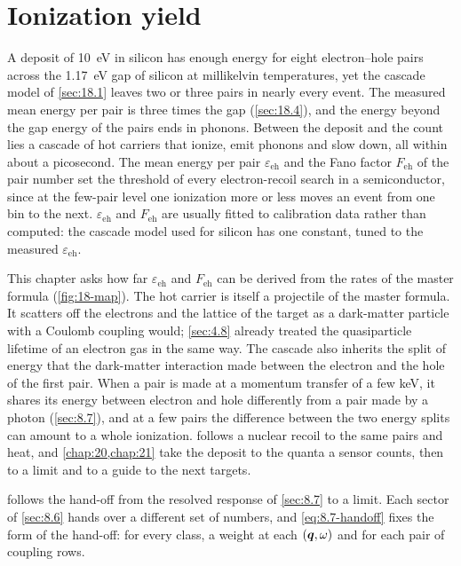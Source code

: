 \chapter{Ionization yield}\label{chap:18}
A deposit of \SI{10}{eV} in silicon has enough energy for eight electron--hole pairs across the \SI{1.17}{eV} gap of silicon at millikelvin temperatures, yet the cascade model of \cref{sec:18.1} leaves two or three pairs in nearly every event. The measured mean energy per pair is three times the gap (\cref{sec:18.4}), and the energy beyond the gap energy of the pairs ends in phonons. Between the deposit and the count lies a cascade of hot carriers that ionize, emit phonons and slow down, all within about a picosecond. The mean energy per pair $\varepsilon_{\mathrm{eh}}$ and the Fano factor $F_{\mathrm{eh}}$ of the pair number set the threshold of every electron-recoil search in a semiconductor, since at the few-pair level one ionization more or less moves an event from one bin to the next. $\varepsilon_{\mathrm{eh}}$ and $F_{\mathrm{eh}}$ are usually fitted to calibration data rather than computed: the cascade model used for silicon has one constant, tuned to the measured $\varepsilon_{\mathrm{eh}}$.

This chapter asks how far $\varepsilon_{\mathrm{eh}}$ and $F_{\mathrm{eh}}$ can be derived from the rates of the master formula (\cref{fig:18-map}). The hot carrier is itself a projectile of the master formula. It scatters off the electrons and the lattice of the target as a dark-matter particle with a Coulomb coupling would; \cref{sec:4.8} already treated the quasiparticle lifetime of an electron gas in the same way. The cascade also inherits the split of energy that the dark-matter interaction made between the electron and the hole of the first pair. When a pair is made at a momentum transfer of a few keV, it shares its energy between electron and hole differently from a pair made by a photon (\cref{sec:8.7}), and at a few pairs the difference between the two energy splits can amount to a whole ionization.  follows a nuclear recoil to the same pairs and heat, and \cref{chap:20,chap:21} take the deposit to the quanta a sensor counts, then to a limit and to a guide to the next targets.

 follows the hand-off from the resolved response of \cref{sec:8.7} to a limit.\label{sec:8.7-needs} Each sector of \cref{sec:8.6} hands over a different set of numbers, and \cref{eq:8.7-handoff} fixes the form of the hand-off: for every class, a weight at each $(\bm{q},\omega)$ and for each pair of coupling rows.

